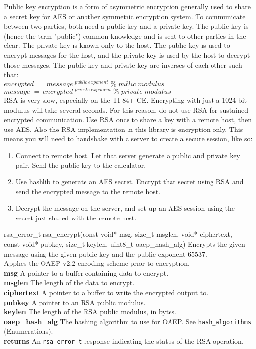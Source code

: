 \documentclass[titlepage]{article}
\begin{document}
			Public key encryption is a form of asymmetric encryption generally used to share a secret key for AES or another symmetric encryption system. To communicate between two parties, both need a public key and a private key. The public key is (hence the term "public") common knowledge and is sent to other parties in the clear. The private key is known only to the host. The public key is used to encrypt messages for the host, and the private key is used by the host to decrypt those messages. The public key and private key are inverses of each other such that:\\
			$ encrypted\;=\;message\;^{public\;exponent} \;\%\;public\;modulus $\\
			$ message\;=\;encrypted\;^{private\;exponent}\;\%\;private\;modulus $\\
			RSA is very slow, especially on the TI-84+ CE. Encrypting with just a 1024-bit modulus will take several seconds. For this reason, do not use RSA for sustained encrypted communication. Use RSA once to share a key with a remote host, then use AES.
			Also the RSA implementation in this library is encryption only. This means you will need to handshake with a server to create a secure session, like so:
			\begin{enumerate}
				\item Connect to remote host. Let that server generate a public and private key pair. Send the public key to the calculator.
				\item Use hashlib to generate an AES secret. Encrypt that secret using RSA and send the encrypted message to the remote host.
				\item Decrypt the message on the server, and set up an AES session using the secret just shared with the remote host.
			\end{enumerate}
			
			\begin{functionspec}[]{rsa\_error\_t rsa\_encrypt(const void* msg, size\_t msglen, void* ciphertext,\\\tabto{40mm}const void* pubkey, size\_t keylen, uint8\_t oaep\_hash\_alg)}
				Encrypts the given message using the given public key and the public exponent $65537$.\\
				Applies the OAEP v2.2 encoding scheme prior to encryption.\\
				\textbf{msg} A pointer to a buffer containing data to encrypt.\\
				\textbf{msglen} The length of the data to encrypt.\\
				\textbf{ciphertext} A pointer to a buffer to write the encrypted output to.\\
				\textbf{pubkey} A pointer to an RSA public modulus.\\
				\textbf{keylen} The length of the RSA public modulus, in bytes.\\
				\textbf{oaep\_hash\_alg} The hashing algorithm to use for OAEP. See \texttt{hash\_algorithms} (Enumerations).\\
				\textbf{returns} An \texttt{rsa\_error\_t} response indicating the status of the RSA operation.
			\end{functionspec}		
		\newpage
\end{document}
